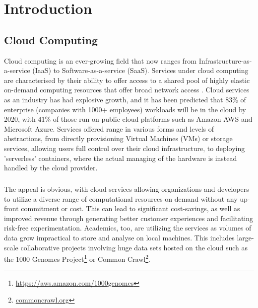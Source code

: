 \documentclass{report}
\begin{document}
\chapter{Introduction}
\section{Cloud Computing}
Cloud computing is an ever-growing field that now ranges from Infrastructure-as-a-service (IaaS) to Software-as-a-service (SaaS). Services under cloud computing are characterised by their ability to offer access to a shared pool of highly elastic on-demand computing resources that offer broad network access \cite{Pallis2010, Mell2011}. Cloud services as an industry has had explosive growth, and it has been predicted that 83\% of enterprise (companies with 1000+ employees) workloads will be in the cloud by 2020\cite{Intricately2019}, with 41\% of those run on public cloud platforms such as Amazon AWS and Microsoft Azure. Services offered range in various forms and levels of abstractions, from directly provisioning Virtual Machines (VMs) or storage services, allowing users full control over their cloud infrastructure, to deploying 'serverless' containers, where the actual managing of the hardware is instead handled by the cloud provider.

\paragraph{}
The appeal is obvious, with cloud services allowing organizations and developers to utilize a diverse range of computational resources on demand without any up-front commitment or cost\cite{Armbrust2009}. This can lead to significant cost-savings, as well as improved revenue through generating better customer experiences and facilitating risk-free experimentation\cite{Power2018}. Academics, too, are utilizing the services as volumes of data grow impractical to store and analyse on local machines\cite{Berriman2013, Ruiz-Alvarez2011}. This includes large-scale collaborative projects involving huge data sets hosted on the cloud such as the 1000 Genomes Project\footnote{\url{https://aws.amazon.com/1000genomes}} or Common Crawl\footnote{\url{commoncrawl.org}}.
\end{document}
